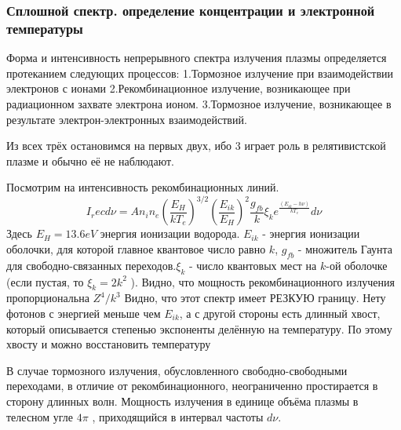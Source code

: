 \documentclass[10pt, a4paper]{article}
\numberwithin{equation}{section}
\begin{document}
\subsubsection{Сплошной спектр. определение концентрации и электронной температуры}
\label{11.2.4}
Форма и интенсивность непрерывного спектра излучения плазмы определяется протеканием следующих процессов:
1.Тормозное излучение при взаимодействии электронов с ионами
2.Рекомбинационное излучение, возникающее при радиационном захвате электрона ионом.
3.Тормозное излучение, возникающее в результате электрон-электронных взаимодействий.

Из всех трёх остановимся на первых двух, ибо 3 играет роль в релятивистской плазме и обычно её не наблюдают.

Посмотрим на интенсивность рекомбинационных линий.
\begin{equation}
	I_rec d\nu = A n_i n_e (\frac{E_H}{kT_e})^{3/2} (\frac{E_{ik}}{E_H})^{2} \frac{g_{fb}}{k} \xi_k e^{\frac{(E_{ik}-h \nu)}{kT_e}} d\nu 
\end{equation}
Здесь $E_H = 13.6 eV$ энергия ионизации водорода. $E_{ik}$ - энергия ионизации оболочки, для которой главное квантовое число равно $k$, $g_{fb}$ - множитель Гаунта для свободно-связанных переходов.$ \xi_k$ - число квантовых мест на $k$-ой оболочке (если пустая, то $ \xi_k = 2k^{2}$ ). 
Видно, что мощность рекомбинационного излучения пропорциональна $Z^{4}/k^3$
Видно, что этот спектр имеет РЕЗКУЮ границу. Нету фотонов с энергией меньше чем $E_{ik}$, а с другой стороны есть длинный хвост, который описывается степенью экспоненты делённую на температуру. По этому хвосту и можно восстановить температуру

\begin{figure}[h!]
\end{figure}

В случае тормозного излучения, обусловленного свободно-свободными переходами, в отличие от рекомбинационного, неограниченно простирается в сторону длинных волн. Мощность излучения в единице объёма плазмы в телесном угле $4 \pi$ , приходящийся в интервал частоты $d\nu$.
\end{document}
